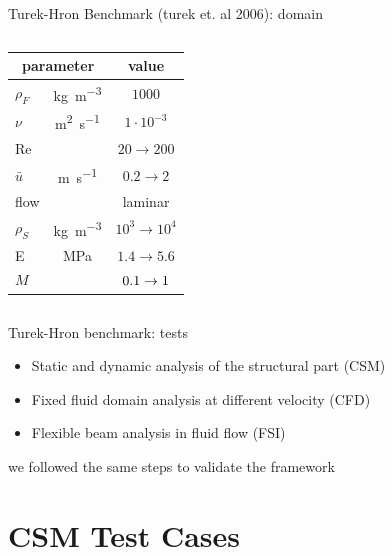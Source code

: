\documentclass[10pt,t]{beamer}
\begin{document}
\begin{frame}{Turek-Hron  Benchmark (turek et. al 2006): domain}
\begin{columns}
		\vspace{0.5cm}
		\begin{tabular}{ l c  | c } 
			\multicolumn{2}{c|}{parameter} & value  \\ 
			\hline
			$\rho_F$ & \si{kg.m^{-3}} & \cellcolor{blue!20} $1000$   \\
			$\nu$& \si{m^2.s^{-1}} & \cellcolor{blue!20} $1 \cdot 10^{-3}$  \\
			Re &  & \cellcolor{blue!20} $20 \rightarrow 200$  \\
			$\bar{u}$ & \si{m.s^{-1}} & \cellcolor{blue!20} $0.2 \rightarrow 2 $ \\
			flow & & \cellcolor{blue!20} laminar \\
			\hline
			$\rho_S$ & \si{kg.m^{-3}} & \cellcolor{orange!50} $10^{3} \rightarrow 10^{4}$    \\
			E & \si{MPa} & \cellcolor{orange!50} $1.4 \rightarrow 5.6$    \\
			\hline
			$M$ & & $ \cellcolor{green!10} 0.1 \rightarrow 1$     \\

		\end{tabular}
\end{columns}

\end{frame}

\begin{frame}{Turek-Hron benchmark: tests}
    
    \begin{itemize}
        \item Static and dynamic analysis of the structural part (CSM)
        \item Fixed fluid domain analysis at different velocity (CFD)
        \item Flexible beam analysis in fluid flow (FSI)
    \end{itemize}
    
    we followed the same steps to validate the framework
    
\end{frame}


\section{CSM Test Cases}
\end{document}
